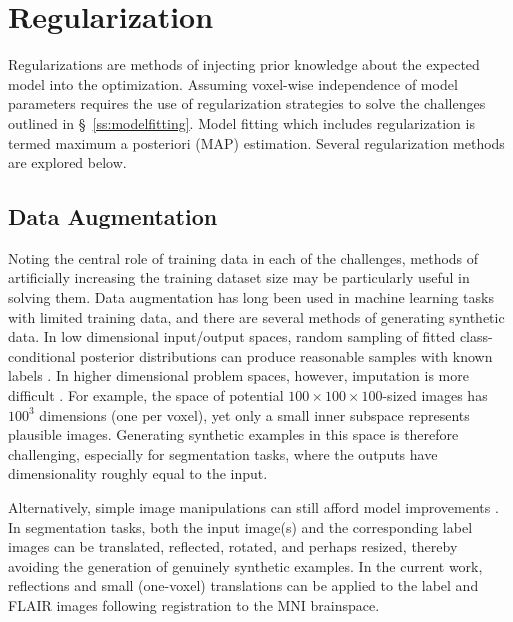 \section{Regularization}\label{s:reg-method}
Regularizations are methods of injecting prior knowledge about the expected model into the optimization. Assuming voxel-wise independence of model parameters requires the use of regularization strategies to solve the challenges outlined in \S\ \ref{ss:modelfitting}. Model fitting which includes regularization is termed maximum a posteriori (MAP) estimation. Several regularization methods are explored below.
\subsection{Data Augmentation}
Noting the central role of training data in each of the challenges, methods of artificially increasing the training dataset size may be particularly useful in solving them. Data augmentation has long been used in machine learning tasks with limited training data, and there are several methods of generating synthetic data. In low dimensional input/output spaces, random sampling of fitted class-conditional posterior distributions can produce reasonable samples with known labels \cite{Tanner1987}. In higher dimensional problem spaces, however, imputation is more difficult \cite{Goodfellow2014}. For example, the space of potential $100\times100\times100$-sized images has $100^3$ dimensions (one per voxel), yet only a small inner subspace represents plausible images. Generating synthetic examples in this space is therefore challenging, especially for segmentation tasks, where the outputs have dimensionality roughly equal to the input.
\par
Alternatively, simple image manipulations can still afford model improvements \cite{Krizhevsky2012}. In segmentation tasks, both the input image(s) and the corresponding label images can be translated, reflected, rotated, and perhaps resized, thereby avoiding the generation of genuinely synthetic examples. In the current work, reflections and small (one-voxel) translations can be applied to the label and FLAIR images following registration to the MNI brainspace.
